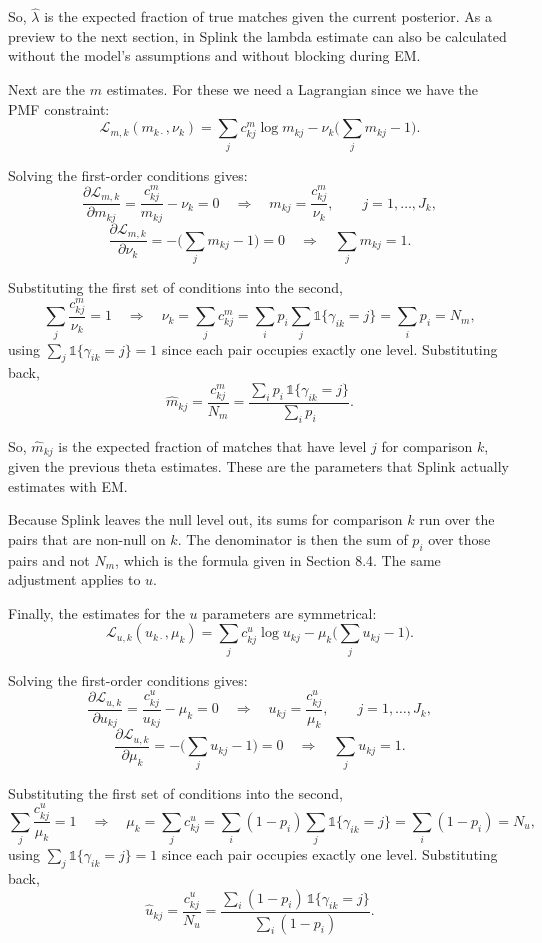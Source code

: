 \documentclass[11pt]{article}
\begin{document}
So, $\hat{\lambda}$ is the expected fraction of true matches given the current posterior. As a preview to the next section, in Splink the lambda estimate can also be calculated without the model's assumptions and without blocking during EM.

Next are the $m$ estimates. For these we need a Lagrangian since we have the PMF constraint:
\[
\mathcal{L}_{m,k}(m_{k\cdot}, \nu_k) = \sum_j c^m_{kj} \log m_{kj} - \nu_k \Big( \sum_j m_{kj} - 1 \Big).
\]

Solving the first-order conditions gives:
\[
\frac{\partial \mathcal{L}_{m,k}}{\partial m_{kj}} = \frac{c^m_{kj}}{m_{kj}} - \nu_k = 0
\quad\Longrightarrow\quad
m_{kj} = \frac{c^m_{kj}}{\nu_k}, \qquad j = 1,\dots,J_k,
\]
\[
\frac{\partial \mathcal{L}_{m,k}}{\partial \nu_k} = -\Big( \sum_j m_{kj} - 1 \Big) = 0
\quad\Longrightarrow\quad
\sum_j m_{kj} = 1.
\]

Substituting the first set of conditions into the second,
\[
\sum_j \frac{c^m_{kj}}{\nu_k} = 1
\quad\Longrightarrow\quad
\nu_k = \sum_j c^m_{kj}
= \sum_i p_i \sum_j \mathds{1}\{\gamma_{ik}=j\}
= \sum_i p_i
= N_m,
\]
using $\sum_j \mathds{1}\{\gamma_{ik}=j\} = 1$ since each pair occupies exactly one level. Substituting back,
\[
\hat m_{kj} = \frac{c^m_{kj}}{N_m}
= \frac{\sum_i p_i \, \mathds{1}\{\gamma_{ik}=j\}}{\sum_i p_i}.
\]

So, $\hat m_{kj}$ is the expected fraction of matches that have level $j$ for comparison $k$, given the previous theta estimates. These are the parameters that Splink actually estimates with EM.

Because Splink leaves the null level out, its sums for comparison $k$ run over the pairs that are non-null on $k$. The denominator is then the sum of $p_i$ over those pairs and not $N_m$, which is the formula given in Section 8.4. The same adjustment applies to $u$.

Finally, the estimates for the $u$ parameters are symmetrical:
\[
\mathcal{L}_{u,k}(u_{k\cdot}, \mu_k) = \sum_j c^u_{kj} \log u_{kj} - \mu_k \Big( \sum_j u_{kj} - 1 \Big).
\]

Solving the first-order conditions gives:
\[
\frac{\partial \mathcal{L}_{u,k}}{\partial u_{kj}} = \frac{c^u_{kj}}{u_{kj}} - \mu_k = 0
\quad\Longrightarrow\quad
u_{kj} = \frac{c^u_{kj}}{\mu_k}, \qquad j = 1,\dots,J_k,
\]
\[
\frac{\partial \mathcal{L}_{u,k}}{\partial \mu_k} = -\Big( \sum_j u_{kj} - 1 \Big) = 0
\quad\Longrightarrow\quad
\sum_j u_{kj} = 1.
\]

Substituting the first set of conditions into the second,
\[
\sum_j \frac{c^u_{kj}}{\mu_k} = 1
\quad\Longrightarrow\quad
\mu_k = \sum_j c^u_{kj}
= \sum_i (1 - p_i) \sum_j \mathds{1}\{\gamma_{ik}=j\}
= \sum_i (1 - p_i)
= N_u,
\]
using $\sum_j \mathds{1}\{\gamma_{ik}=j\} = 1$ since each pair occupies exactly one level. Substituting back,
\[
\hat u_{kj} = \frac{c^u_{kj}}{N_u}
= \frac{\sum_i (1 - p_i) \, \mathds{1}\{\gamma_{ik}=j\}}{\sum_i (1 - p_i)}.
\]
\end{document}
